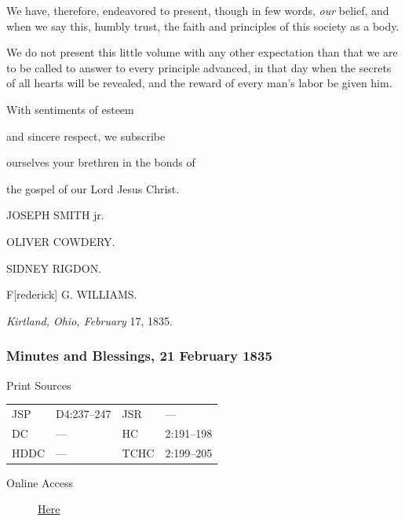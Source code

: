 					We have, therefore, endeavored to present, though in few words, \textit{our} belief, and when we say this, humbly trust, the faith and principles of this society as a body.

					We do not present this little volume with any other expectation than that we are to be called to answer to every principle advanced, in that day when the secrets of all hearts will be revealed, and the reward of every man's labor be given him.

					With sentiments of esteem

					and sincere respect, we subscribe

					ourselves your brethren in the bonds of

					the gospel of our Lord Jesus Christ.

					\begin{tightright}
						JOSEPH SMITH jr.

						OLIVER COWDERY.

						SIDNEY RIGDON.

						F[rederick] G. WILLIAMS.
					\end{tightright}

					\textit{Kirtland, Ohio, February} 17, 1835.
					
		\subsubsection{Minutes and Blessings, 21 February 1835}
			\label{EMS-1835-JS-21-FEB-1835}
			
			\begin{description}
					\item[Print Sources]
				\end{description}

					\begin{tabular}{p{0.5in}p{1in}p{0.5in}p{1in}}
					JSP	 	& D4:237--247		& JSR 		& --- \\
					DC	 	& --- 				& HC 		& 2:191--198 \\
					HDDC 	& ---				& TCHC 		& 2:199--205 \\
					\end{tabular}
				
				\begin{description}
					\item[Online Access] \href{https://www.josephsmithpapers.org/paper-summary/minutes-and-blessings-21-february-1835/1}{Here}
				\end{description}
				
